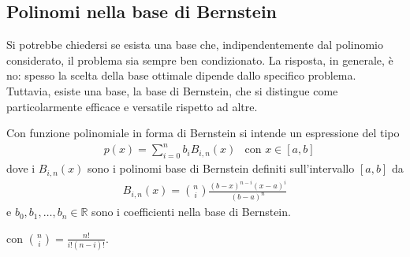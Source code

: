 \documentclass{article}
\begin{document}
\subsection{Polinomi nella base di Bernstein}
Si potrebbe chiedersi se esista una base che, indipendentemente dal polinomio
considerato, il problema sia sempre ben condizionato. La risposta, in
generale, è no: spesso la scelta della base ottimale dipende dallo
specifico problema. Tuttavia, esiste una base, la base di Bernstein, che si
distingue come particolarmente efficace e versatile rispetto ad altre.
\begin{definition}
    Con funzione polinomiale in forma di Bernstein si intende un espressione del
    tipo 
    \begin{equation*}
        \begin{aligned}
       & p(x)=\displaystyle\sum_{i=0}^{n}b_iB_{i,n}(x) & \text{con }x\in[a,b]
        \end{aligned} 
    \end{equation*}
    dove i $B_{i,n}(x)$ sono i polinomi base di Bernstein definiti sull'intervallo
    $[a,b]$ da 
    \begin{equation} \label{eq:bernstein}
        \begin{aligned}
            B_{i,n}(x)=\binom{n}{i}\frac{(b-x)^{n-i}(x-a)^i}{(b-a)^n}
        \end{aligned} 
    \end{equation}
    e $b_0,b_1,\ldots,b_n\in \mathbb{R}$ sono i coefficienti nella base di
    Bernstein.
\end{definition}
con $\binom{n}{i}=\frac{n!}{i!(n-i)!}$.
\end{document}
